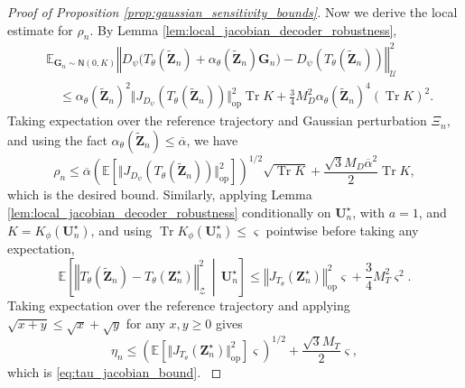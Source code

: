 \documentclass[11pt]{article}
\newcommand{\bbE}{\mathbb{E}}
\newcommand{\wt}{\widetilde}
\newcommand{\ol}{\overline}
\newcommand{\jg}[1]{{\color{red}#1}}
\begin{document}
\begin{proof}[Proof of Proposition \ref{prop:gaussian_sensitivity_bounds}]
Now we derive the local estimate for $\rho_n$. By Lemma \ref{lem:local_jacobian_decoder_robustness},
\begin{align*}
    &\bbE_{\mathbf{G}_n\sim\mathsf N(0,K)}\left\Vert D_\psi\bigl(T_\theta(\wt{\mathbf Z}_n)+\alpha_\theta(\wt{\mathbf Z}_n)\mathbf G_n\bigr)-D_\psi(T_\theta(\wt{\mathbf Z}_n))\right\Vert_\mathcal{U}^2\\
    &\quad\leq\alpha_\theta(\wt{\mathbf Z}_n)^2\bigl\Vert J_{D_\psi}(T_\theta(\wt{\mathbf Z}_n))\bigr\Vert_\mathrm{op}^2\operatorname{Tr} K +\frac{3}{4}M_D^2\alpha_\theta(\wt{\mathbf Z}_n)^4(\operatorname{Tr} K)^2.
\end{align*}
Taking expectation over the reference trajectory and Gaussian perturbation $\Xi_n$, and using the fact $\alpha_\theta(\wt{\mathbf Z}_n)\leq\ol\alpha$, we have
\begin{equation*}
    \rho_n\leq\ol\alpha\left(\bbE\left[\Vert J_{D_\psi}(T_\theta(\wt{\mathbf Z}_n))\Vert_\mathrm{op}^2\right]\right)^{1/2}\sqrt{\operatorname{Tr} K}+\frac{\sqrt{3}M_D\ol\alpha^2}{2}\operatorname{Tr} K,
\end{equation*}
which is the desired bound. Similarly, \jg{applying Lemma \ref{lem:local_jacobian_decoder_robustness} conditionally on $\mathbf U_n^\star$, with $a = 1$, and $K=K_\phi(\mathbf U_n^\star)$, and using $\operatorname{Tr} K_\phi(\mathbf U_n^\star)\leq\varsigma$ pointwise before taking any expectation,
\[
    \mathbb E\left[\left\Vert T_\theta(\wt{\mathbf Z}_n)-T_\theta(\mathbf Z_n^\star)\right\Vert_{\mathcal Z}^2\,\middle|\,\mathbf U_n^\star\right]
    \leq
    \left\Vert J_{T_\theta}(\mathbf Z_n^\star)\right\Vert_\mathrm{op}^2\varsigma+\frac{3}{4}M_T^2\varsigma^2.
\]
Taking expectation over the reference trajectory and applying $\sqrt{x+y}\leq\sqrt{x}+\sqrt{y}$ for any $x,y\geq0$ gives
\begin{equation*}
    \eta_n\leq\left(\bbE\left[\Vert J_{T_\theta}(\mathbf Z^\star_n)\Vert_\mathrm{op}^2\right]\varsigma\right)^{1/2}+\frac{\sqrt{3}M_T}{2}\varsigma,
\end{equation*}
which is \eqref{eq:tau_jacobian_bound}.
}
\end{proof}
\end{document}
